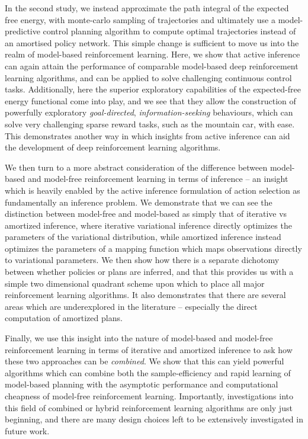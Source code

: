 In the second study, we instead approximate the path integral of the expected free energy, with monte-carlo sampling of trajectories and ultimately use a model-predictive control planning algorithm to compute optimal trajectories instead of an amortised policy network. This simple change is sufficient to move us into the realm of model-based reinforcement learning. Here, we show that active inference can again attain the performance of comparable model-based deep reinforcement learning algorithms, and can be applied to solve challenging continuous control tasks. Additionally, here the superior exploratory capabilities of the expected-free energy functional come into play, and we see that they allow the construction of powerfully exploratory \emph{goal-directed}, \emph{information-seeking} behaviours, which can solve very challenging sparse reward tasks, such as the mountain car, with ease. This demonstrates another way in which insights from active inference can aid the development of deep reinforcement learning algorithms.

We then turn to a more abstract consideration of the difference between model-based and model-free reinforcement learning in terms of inference -- an insight which is heavily enabled by the active inference formulation of action selection as fundamentally an inference problem. We demonstrate that we can see the distinction between model-free and model-based as simply that of iterative vs amortized inference, where iterative variational inference directly optimizes the parameters of the variational distribution, while amortized inference instead optimizes the parameters of a mapping function which maps observations directly to variational parameters. We then show how there is a separate dichotomy between whether policies or plans are inferred, and that this provides us with a simple two dimensional quadrant scheme upon which to place all major reinforcement learning algorithms. It also demonstrates that there are several areas which are underexplored in the literature -- especially the direct computation of amortized plans.

Finally, we use this insight into the nature of model-based and model-free reinforcement learning in terms of iterative and amortized inference to ask how these two approaches can be \emph{combined}. We show that this can yield powerful algorithms which can combine both the sample-efficiency and rapid learning of model-based planning with the asymptotic performance and computational cheapness of model-free reinforcement learning. Importantly, investigations into this field of combined or hybrid reinforcement learning algorithms are only just beginning, and there are many design choices left to be extensively investigated in future work.


